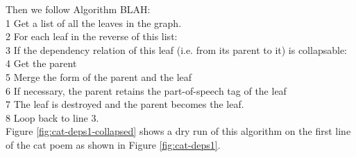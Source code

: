 Then we follow Algorithm BLAH:\\
1 Get a list of all the leaves in the graph.\\
2 For each leaf in the reverse of this list:\\
3	If the dependency relation of this leaf (i.e. from its parent to it) is collapsable:\\
4		Get the parent\\
5		Merge the form of the parent and the leaf\\
6		If necessary, the parent retains the part-of-speech tag of the leaf\\
7		The leaf is destroyed and the parent becomes the leaf.\\
8		Loop back to line 3.\\

Figure \ref{fig:cat-deps1-collapsed} shows a dry run of this algorithm on the first line of the cat poem as shown in Figure \ref{fig:cat-deps1}.


